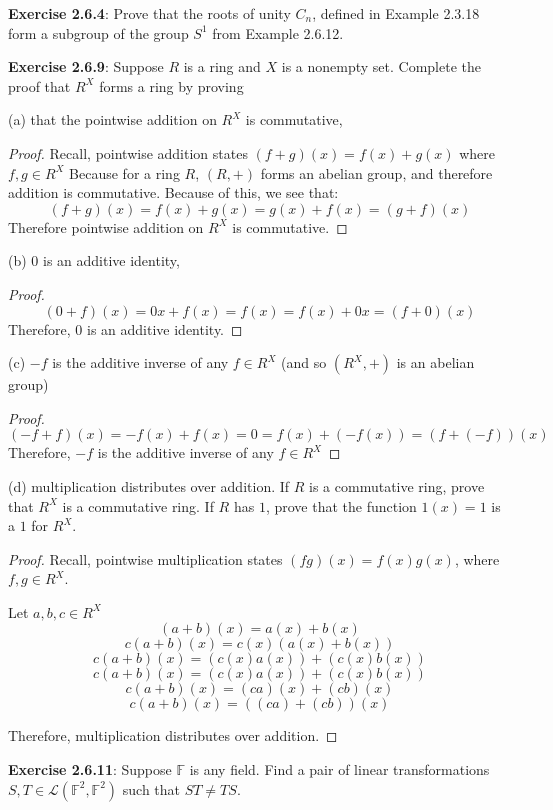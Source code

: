 \documentclass[a4paper]{article}
\begin{document}
\begin{myparindent}{0pt}
\textbf{Exercise 2.6.4}:
Prove that the roots of unity $C_n$, defined in Example 2.3.18 form a subgroup
of the group $S^1$ from Example 2.6.12. \newline

\textbf{Exercise 2.6.9}:
Suppose $R$  is a ring and $X$ is a nonempty set. Complete the proof that $R^X$
forms a ring by proving

(a) that the pointwise addition on $R^X$ is commutative,
\begin{proof}
  Recall, pointwise addition states $(f + g)(x) = f(x) + g(x)$ where $f, g \in R^X$
  Because for a ring $R$, $(R, +)$ forms an abelian group, and therefore addition
  is commutative. Because of this, we see that:
  \[ (f + g)(x) = f(x) + g(x) = g(x) + f(x) = (g + f)(x) \]
  Therefore pointwise addition on $R^X$ is commutative.
\end{proof}

(b) 0 is an additive identity,
\begin{proof}
  \[ (0 + f)(x) = 0x + f(x) = f(x) = f(x) + 0x = (f + 0)(x) \]
  Therefore, $0$ is an additive identity.
\end{proof}

(c) $-f$ is the additive inverse of any
$f \in R^X$ (and so $(R^X, +)$ is an abelian group)
\begin{proof}
  \[ (-f + f)(x) = -f(x) + f(x) = 0 = f(x) + (-f(x)) = (f + (-f))(x) \]
  Therefore, $-f$ is the additive inverse of any $f \in R^X$
\end{proof}

(d) multiplication
distributes over addition. If $R$ is a commutative ring, prove that $R^X$ is a
commutative ring. If $R$ has $1$, prove that the function $1(x) = 1$ is a $1$
for $R^X$. \newline
\begin{proof}
  Recall, pointwise multiplication states $(fg)(x) = f(x)g(x)$, where $f, g \in R^X$.
  \newline

  Let $a, b, c \in R^X$
  \[ (a + b)(x) = a(x) + b(x) \]
  \[ c(a + b)(x) = c(x) (a(x) + b(x)) \]
  \[ c(a + b)(x) = (c(x) a(x)) + (c(x) b(x)) \]
  \[ c(a + b)(x) = (c(x) a(x)) + (c(x) b(x)) \]
  \[ c(a + b)(x) = (ca)(x) + (cb)(x) \]
  \[ c(a + b)(x) = ((ca) + (cb))(x) \]

  Therefore, multiplication distributes over addition.
\end{proof}

\textbf{Exercise 2.6.11}:
Suppose $\mathbb{F}$ is any field. Find a pair of linear transformations
$S, T \in \mathcal{L}(\mathbb{F}^2, \mathbb{F}^2)$ such that $ST \neq TS$.
\newline


\end{myparindent}
\end{document}
